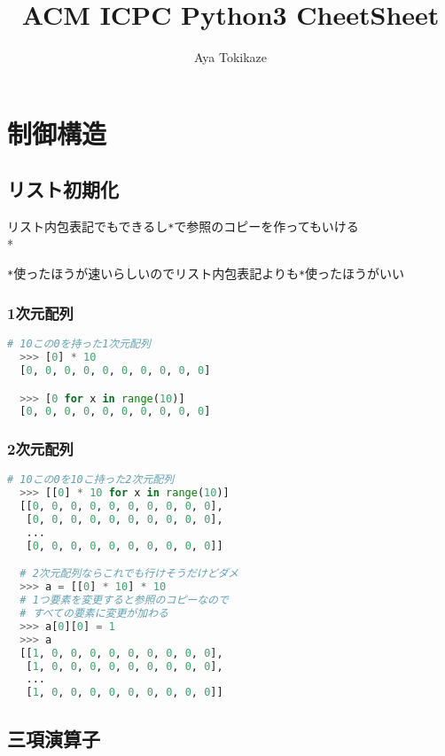 \documentclass[uplatex, 11pt]{jsarticle}
\title{ACM ICPC Python3 CheetSheet}
\author{Aya Tokikaze}
\begin{document}
\maketitle

\tableofcontents



\section{制御構造}

\subsection{リスト初期化}

リスト内包表記でもできるし\texttt{*}で参照のコピーを作ってもいける \\*

\texttt{*}使ったほうが速いらしいのでリスト内包表記よりも\texttt{*}使ったほうがいい

\subsubsection{1次元配列}

\begin{lstlisting}[language=Python]
  # 10この0を持った1次元配列
  >>> [0] * 10
  [0, 0, 0, 0, 0, 0, 0, 0, 0, 0]

  >>> [0 for x in range(10)]
  [0, 0, 0, 0, 0, 0, 0, 0, 0, 0]
\end{lstlisting}

\subsubsection{2次元配列}

\begin{lstlisting}[language=Python]
  # 10この0を10こ持った2次元配列
  >>> [[0] * 10 for x in range(10)]
  [[0, 0, 0, 0, 0, 0, 0, 0, 0, 0],
   [0, 0, 0, 0, 0, 0, 0, 0, 0, 0],
   ...
   [0, 0, 0, 0, 0, 0, 0, 0, 0, 0]]

  # 2次元配列ならこれでも行けそうだけどダメ
  >>> a = [[0] * 10] * 10
  # 1つ要素を変更すると参照のコピーなので
  # すべての要素に変更が加わる
  >>> a[0][0] = 1
  >>> a
  [[1, 0, 0, 0, 0, 0, 0, 0, 0, 0],
   [1, 0, 0, 0, 0, 0, 0, 0, 0, 0],
   ...
   [1, 0, 0, 0, 0, 0, 0, 0, 0, 0]]
\end{lstlisting}

\newpage

\subsection{三項演算子}
\end{document}
